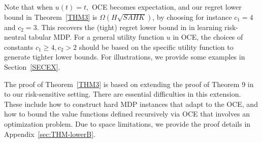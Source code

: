 \documentclass[11pt]{article}
\newcommand{\1}{\mathbbm{1}}
\newcommand{\gao}[1]{\textcolor{blue}{{#1}}} %
\begin{document}


Note that when $u(t)=t,$ OCE becomes expectation, and our regret lower bound in Theorem~\ref{THM3} is $\Omega(H\sqrt{SAHK})$, by choosing for instance $c_1=4$ and $c_2=3$. This recovers the (tight) regret lower bound in \cite{domingues2021episodic} in learning risk-neutral tabular MDP. For a general utility function $u$ in OCE,  
the choices of  constants $c_1\geq 4, c_2>2$ should be based on the specific utility function to generate tighter lower bounds. For illustrations, we provide some examples in Section~\ref{SECEX}.


The proof of Theorem~\ref{THM3} is based on extending the proof of Theorem 9 in \cite{domingues2021episodic} to our risk-sensitive setting.
There are essential difficulties in this extension. These include how to construct hard MDP instances that adapt to the OCE, and how to bound the value functions defined recursively via OCE that involves an optimization problem. Due to space limitations, we provide the proof details in Appendix~\ref{sec:THM-lowerB}. %
\end{document}
